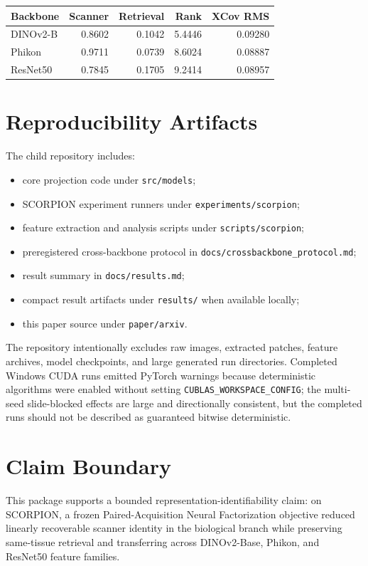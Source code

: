 \documentclass[10pt]{article}
\begin{document}
\begin{center}
\centering
{}
\scriptsize
\setlength{\tabcolsep}{2.8pt}
\begin{tabular}{@{}lrrrr@{}}
\toprule
Backbone & Scanner & Retrieval & Rank & XCov RMS \\
\midrule
DINOv2-B & 0.8602 & 0.1042 & 5.4446 & 0.09280 \\
Phikon & 0.9711 & 0.0739 & 8.6024 & 0.08887 \\
ResNet50 & 0.7845 & 0.1705 & 9.2414 & 0.08957 \\
\bottomrule
\end{tabular}
\label{tab:acquisition_audit}
\end{center}

\section{Reproducibility Artifacts}
The child repository includes:
\begin{itemize}
  \item core projection code under \texttt{src/models};
  \item SCORPION experiment runners under \texttt{experiments/scorpion};
  \item feature extraction and analysis scripts under \texttt{scripts/scorpion};
  \item preregistered cross-backbone protocol in \texttt{docs/crossbackbone\_protocol.md};
  \item result summary in \texttt{docs/results.md};
  \item compact result artifacts under \texttt{results/} when available locally;
  \item this paper source under \texttt{paper/arxiv}.
\end{itemize}

The repository intentionally excludes raw images, extracted patches, feature archives, model checkpoints, and large generated run directories. Completed Windows CUDA runs emitted PyTorch warnings because deterministic algorithms were enabled without setting \texttt{CUBLAS\_WORKSPACE\_CONFIG}; the multi-seed slide-blocked effects are large and directionally consistent, but the completed runs should not be described as guaranteed bitwise deterministic.

\section{Claim Boundary}
This package supports a bounded representation-identifiability claim: on SCORPION, a frozen Paired-Acquisition Neural Factorization objective reduced linearly recoverable scanner identity in the biological branch while preserving same-tissue retrieval and transferring across DINOv2-Base, Phikon, and ResNet50 feature families.
\end{document}

